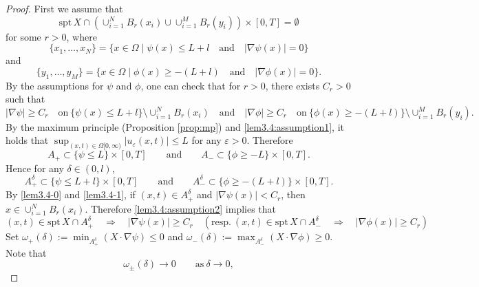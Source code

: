 \documentclass[10pt,a4paper]{amsart}
\newcommand{\spt}{\mathrm{spt}\,}
\begin{document}
\begin{proof}
First we assume that 
\begin{equation}\label{lem3.4:assumption2}
\spt X \cap \left( \cup_{i=1} ^N B_r (x_i) \cup \cup_{i=1} ^M B_r (y_i) \right)
\times [0,T] = \emptyset
\end{equation}
for some $r>0$, 
where 
\[
\{x_1,\dots,x_N\}
=\{ x \in \Omega \mid \psi (x) \leq L+l \quad \text{and} \quad
    |\nabla \psi (x)|=0 \}
\]
and
\[
\{y_1,\dots,y_M \}
=\{ x \in \Omega \mid \phi (x) \geq -(L+l) \quad \text{and} \quad
    |\nabla \phi (x)|=0 \}.
\]
By the assumptions for $\psi$ and $\phi$, one can check that 
for $r>0$, there exists $C_r >0$ such that
\begin{equation}\label{lem3.4-0}
|\nabla \psi | \geq C_r \quad \text{on} \ \{ \psi (x) \leq L+l \} \setminus \cup_{i=1} ^N B_r (x_i)
\quad \text{and} \quad 
|\nabla \phi | \geq C_r \quad \text{on} \ \{ \phi (x) \geq -(L+l) \} \setminus \cup_{i=1} ^M B_r (y_i).
\end{equation}
By the maximum principle (Proposition \ref{prop:mp}) and \eqref{lem3.4:assumption1},
it holds that $\sup_{(x,t) \in \Omega [0,\infty)} |u_\varepsilon (x,t)| \leq L $ for any $\varepsilon >0$. Therefore 
\begin{equation*}
A_+ \subset \{ \psi \leq L \} \times [0,T]
\qquad \text{and} \qquad
A_- \subset \{ \phi \geq -L \} \times [0,T] .
\end{equation*}
Hence for any $\delta \in (0,l)$, 
\begin{equation}\label{lem3.4-1}
A_+ ^\delta \subset \{ \psi \leq L +l \} \times [0,T]
\qquad \text{and} \qquad
A_- ^\delta \subset \{ \phi \geq -(L+l) \} \times [0,T] .
\end{equation}
By \eqref{lem3.4-0} and \eqref{lem3.4-1}, if $(x,t) \in A_+ ^\delta$ and $|\nabla \psi (x)| <C_r$,
then $x \in \cup_{i=1} ^N B_r (x_i)$. Therefore \eqref{lem3.4:assumption2} implies that
\begin{equation}\label{lem3.4-2}
(x,t) \in \spt X \cap A_+^\delta
\quad \Rightarrow \quad
|\nabla \psi (x) | \geq C_r
\quad
(\text{resp.} \ (x,t) \in \spt X \cap A_- ^\delta
\quad \Rightarrow \quad
|\nabla \phi (x) | \geq C_r
)
\end{equation}
Set $\omega _+ (\delta) := \min_{A_+ ^\delta} (X \cdot \nabla \psi) \leq 0$ and
$\omega _- (\delta) := \max_{A_- ^\delta} (X \cdot \nabla \phi) \geq 0$. Note that
\begin{equation}
\omega _{\pm} (\delta) \to 0 \qquad \text{as} \ \delta \to 0,
\end{equation}

\end{proof}
\end{document}
